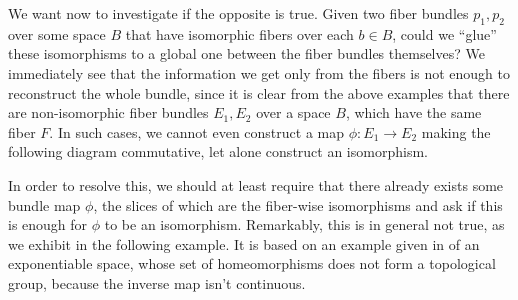 We want now to investigate if the opposite is true. Given two fiber bundles $p_1, p_2$ over some space $B$ that have isomorphic fibers over each $b\in B$, could we ``glue'' these isomorphisms to a global one between the fiber bundles themselves? We immediately see that the information we get only from the fibers is not enough to reconstruct the whole bundle, since it is clear from the above examples that there are non-isomorphic fiber bundles $E_1, E_2$ over a space $B$, which have the same fiber $F$. In such cases, we cannot even construct a map $\phi:E_1\to E_2$ making the following diagram commutative, let alone construct an isomorphism.
\begin{center}
\end{center}
In order to resolve this, we should at least require that there already exists some bundle map $\phi$, the slices of which are the fiber-wise isomorphisms and ask if this is enough for $\phi$ to be an isomorphism. Remarkably, this is in general not true, as we exhibit in the following example. It is based on an example given in \cite{counterexample} of an exponentiable space, whose set of homeomorphisms does not form a topological group, because the inverse map isn't continuous.

